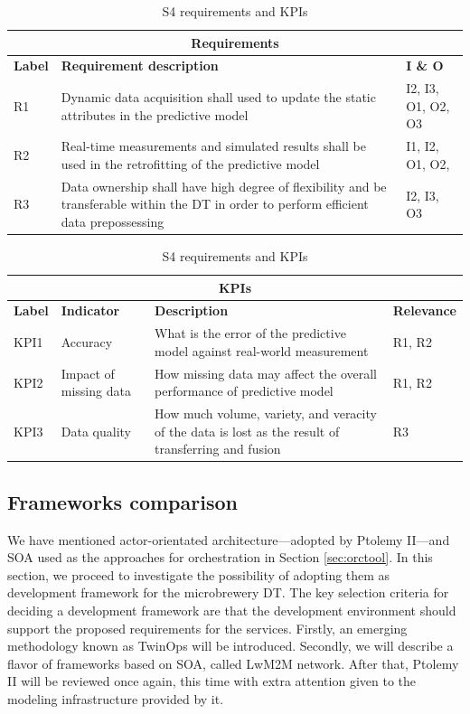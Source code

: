 \documentclass[journal,onecolumn]{IEEEtran} %
\begin{document}
\begin{table}[hbt!]
\centering
\begin{tabularx}{0.8\textwidth}{|p{1cm}|X|p{1.5cm}|}
\hline
\multicolumn{3}{|c|}{\textbf{Requirements}} \\
\hline
\textbf{Label} & \textbf{Requirement description} & \textbf{I \& O} \\ 
\hline            
R1 & Dynamic data acquisition shall used to update the static attributes in the predictive model & I2, I3, O1, O2, O3 \\ 
\hline
R2 & Real-time measurements and simulated results shall be used in the retrofitting of the predictive model  & I1, I2, O1, O2, \\ 
\hline
R3 & Data ownership shall have high degree of flexibility and be transferable within the DT in order to perform efficient data prepossessing & I2, I3, O3 \\ 
\hline \hline
\end{tabularx}
\begin{tabularx}{0.8\textwidth}{|p{1cm}|p{2cm}|X|p{1.5cm}|}
\multicolumn{4}{|c|}{\textbf{KPIs}} \\ 
\hline
\textbf{Label} & \textbf{Indicator} & \textbf{Description} & \textbf{Relevance} \\ 
\hline
KPI1 & Accuracy & What is the error of the predictive model against real-world measurement & R1, R2\\ 
\hline
KPI2 & Impact of missing data & How missing data may affect the overall performance of predictive model & R1, R2 \\ 
\hline
KPI3 & Data quality & How much volume, variety, and veracity of the data is lost as the result of transferring and fusion & R3 \\
\hline
\end{tabularx}
\caption{S4 requirements and KPIs}
\label{tab:s4rqkpi}
\end{table}


\subsection{Frameworks comparison}\label{sec:frameworks}
We have mentioned actor-orientated architecture---adopted by Ptolemy II---and SOA used as the approaches for orchestration in Section \ref{sec:orctool}. In this section, we proceed to investigate the possibility of adopting them as development framework for the microbrewery DT. The key selection criteria for deciding a development framework are that the development environment should support the proposed requirements for the services. Firstly, an emerging methodology known as TwinOps will be introduced. Secondly, we will describe a flavor of frameworks based on SOA, called LwM2M network. After that, Ptolemy II will be reviewed once again, this time with extra attention given to the modeling infrastructure provided by it.
\end{document}
